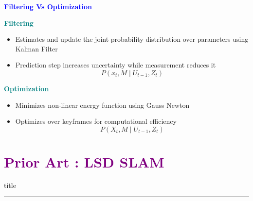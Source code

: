 \documentclass[aspectratio=169]{beamer}
\begin{document}
\begin{frame}{\textcolor{blue}{\textbf{Filtering Vs Optimization}}}
	\vspace{-0.5cm}

	
	\begin{block}{\textbf{\textcolor{teal}{Filtering}}}
	\begin{itemize}
			\item Estimates and update the joint probability distribution over parameters using Kalman Filter
			\item Prediction step increases uncertainty while measurement reduces it
			\begin{equation}
				P\left(x_t, M \mid U_{t-1}, Z_t\right)
			\end{equation}
	\end{itemize}  
	\end{block}

	\begin{block}{\textbf{\textcolor{teal}{Optimization}}}
		\begin{itemize}
				\item Minimizes non-linear energy function using Gauss Newton
				\item Optimizes over keyframes for computational efficiency
				\begin{equation}
					P\left(X_t, M \mid U_{t-1}, Z_t\right)
				\end{equation}
		\end{itemize}
	\end{block}

\end{frame}

\section{\textbf{\textcolor{purple}{Prior Art : LSD SLAM}}}
		\begin{frame}[plain]
				\vfill
			\centering
			\begin{beamercolorbox}[sep=8pt,center,shadow=true,rounded=true]{title}
				\insertsectionhead\par%
				\color{oxfordblue}\noindent\rule{10cm}{1pt}
			\end{beamercolorbox}
			\vfill

	\end{frame}
\end{document}
